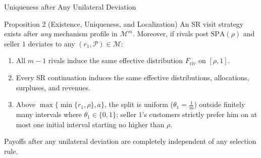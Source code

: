 \documentclass[11pt,aspectratio=169,handout]{beamer}
\newcommand{\SPA}{\mathrm{SPA}}
\begin{document}
\begin{frame}{Uniqueness after Any Unilateral Deviation}
\begin{block}{Proposition 2 (Existence, Uniqueness, and Localization)}
An SR visit strategy exists after \emph{any} mechanism profile in $\mathcal M^m$. Moreover, if rivals post $\SPA(\rho)$ and seller $1$ deviates to any $(r_1,\mathcal P)\in\mathcal M$:
\begin{enumerate}
\item All $m-1$ rivals induce the same effective distribution $F_{\mathrm{riv}}$ on $[\rho,1]$.
\item Every SR continuation induces the same effective distributions, allocations, surpluses, and revenues.
\item Above $\max\{\min\{r_1,\rho\},a\}$, the split is uniform ($\theta_1=\frac1m$) outside finitely many intervals where $\theta_1\in\{0,1\}$; seller $1$'s customers strictly prefer him on at most one initial interval starting no higher than $\rho$.
\end{enumerate}
\end{block}

\medskip{}
Payoffs after any unilateral deviation are completely independent of any selection rule.
\end{frame}
\end{document}
